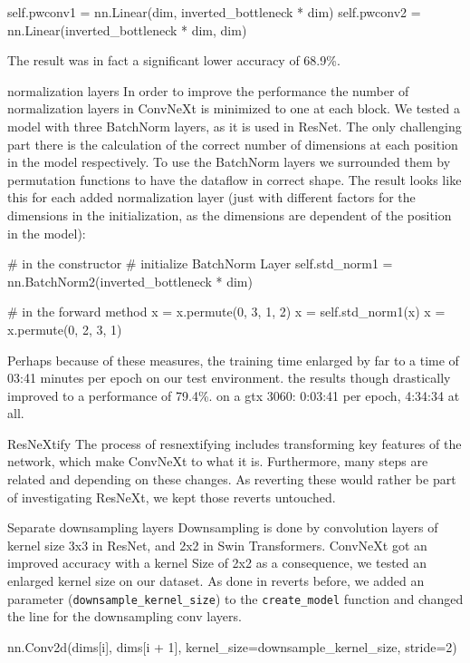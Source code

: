 \documentclass{article}
\begin{document}
\begin{python}
self.pwconv1 = nn.Linear(dim, inverted_bottleneck * dim)
self.pwconv2 = nn.Linear(inverted_bottleneck * dim, dim)
\end{python}

The result was in fact a significant lower accuracy of 68.9\%.

normalization layers
In order to improve the performance the number of normalization layers in ConvNeXt is minimized to one at each block.
We tested a model with three BatchNorm layers, as it is used in ResNet.
The only challenging part there is the calculation of the correct number of dimensions at each position in the model respectively.
To use the BatchNorm layers we surrounded them by permutation functions to have the dataflow in correct shape.
The result looks like this for each added normalization layer (just with different factors for the dimensions in the initialization, as the dimensions are dependent of the position in the model):

\begin{python}
# in the constructor
# initialize BatchNorm Layer
self.std_norm1 = nn.BatchNorm2(inverted_bottleneck * dim)

# in the forward method
x = x.permute(0, 3, 1, 2)
x = self.std_norm1(x)
x = x.permute(0, 2, 3, 1)
\end{python}


Perhaps because of these measures, the training time enlarged by far to a time of 03:41 minutes per epoch on our test environment.
the results though drastically improved to a performance of 79.4\%.
on a gtx 3060: 0:03:41 per epoch, 4:34:34 at all.

ResNeXtify
The process of resnextifying includes transforming key features of the network, which make ConvNeXt to what it is.
Furthermore, many steps are related and depending on these changes.
As reverting these would rather be part of investigating ResNeXt, we kept those reverts untouched.

Separate downsampling layers
Downsampling is done by convolution layers of kernel size 3x3 in ResNet, and 2x2 in Swin Transformers.
ConvNeXt got an improved accuracy with a kernel Size of 2x2 as a consequence, we tested an enlarged kernel size on our dataset.
As done in reverts before, we added an parameter (\texttt{downsample\_kernel\_size}) to the \texttt{create\_model} function and changed the line for the downsampling conv layers.

\begin{python}
nn.Conv2d(dims[i], dims[i + 1],
    kernel_size=downsample_kernel_size, stride=2)
\end{python}
\end{document}
